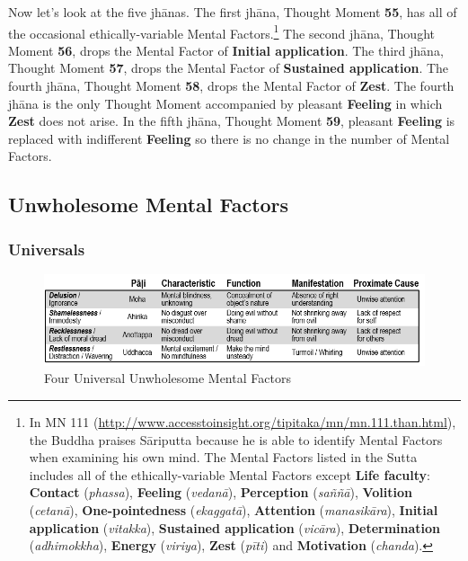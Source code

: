 Now let’s look at the five jhānas. The first jhāna, Thought Moment \textbf{55}, has all of the occasional ethically-variable Mental Factors.\footnote{In MN 111 (\url{http://www.accesstoinsight.org/tipitaka/mn/mn.111.than.html}), the Buddha praises Sāriputta because he is able to identify Mental Factors when examining his own mind. The Mental Factors listed in the Sutta includes all of the ethically-variable Mental Factors except \textbf{Life faculty}: \textbf{Contact} (\textit{phassa}), \textbf{Feeling} (\textit{vedanā}), \textbf{Perception} (\textit{saññā}), \textbf{Volition} (\textit{cetanā}), \textbf{One-pointedness} (\textit{ekaggatā}), \textbf{Attention} (\textit{manasikāra}), \textbf{Initial application} (\textit{vitakka}), \textbf{Sustained application} (\textit{vicāra}), \textbf{Determination} (\textit{adhimokkha}), \textbf{Energy} (\textit{viriya}), \textbf{Zest} (\textit{pīti}) and \textbf{Motivation} (\textit{chanda}).} The second jhāna, Thought Moment \textbf{56}, drops the Mental Factor of \textbf{Initial application}. The third jhāna, Thought Moment \textbf{57}, drops the Mental Factor of \textbf{Sustained application}. The fourth jhāna, Thought Moment \textbf{58}, drops the Mental Factor of \textbf{Zest}. The fourth jhāna is the only Thought Moment accompanied by pleasant \textbf{Feeling} in which \textbf{Zest} does not arise. In the fifth jhāna, Thought Moment \textbf{59}, pleasant \textbf{Feeling} is replaced with indifferent \textbf{Feeling} so there is no change in the number of Mental Factors.

\subsection*{Unwholesome Mental Factors}

\subsubsection*{Universals}

\begin{figure}[h]
\centering
\includegraphics[width=0.8\linewidth]{./Diagrams/U-U}
\caption{Four Universal Unwholesome Mental Factors}
\label{fig:U-U}
\end{figure}

